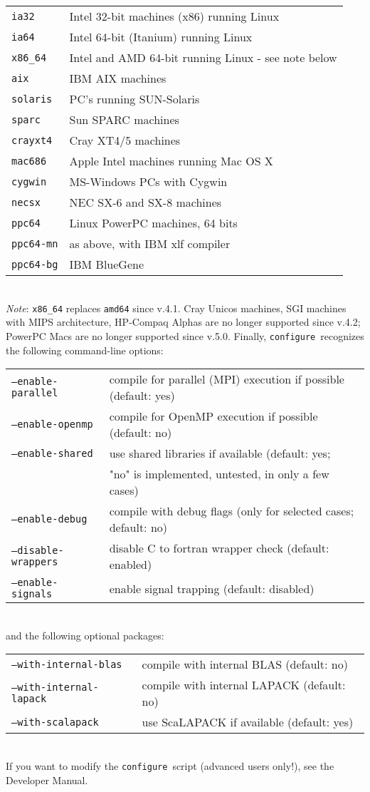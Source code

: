 \documentclass[12pt,a4paper]{article}
\def\configure{\texttt{configure}}
\begin{document}
\begin{tabular}{ll}
\texttt{ia32}&    Intel 32-bit machines (x86) running Linux\\
\texttt{ia64}&    Intel 64-bit (Itanium) running Linux\\
\texttt{x86\_64}&  Intel and AMD 64-bit running Linux - see note below\\
\texttt{aix}&     IBM AIX machines\\
\texttt{solaris}& PC's running SUN-Solaris\\
\texttt{sparc}&   Sun SPARC machines\\
\texttt{crayxt4}& Cray XT4/5 machines\\
\texttt{mac686}&  Apple Intel machines running Mac OS X\\
\texttt{cygwin}&  MS-Windows PCs with Cygwin\\
\texttt{necsx}&   NEC SX-6 and SX-8 machines\\
\texttt{ppc64}&   Linux PowerPC machines, 64 bits\\
\texttt{ppc64-mn}&as above, with IBM xlf compiler\\
\texttt{ppc64-bg}&IBM BlueGene
\end{tabular}\\
{\em Note}: \texttt{x86\_64} replaces \texttt{amd64} since v.4.1. 
Cray Unicos machines, SGI 
machines with MIPS architecture, HP-Compaq Alphas are no longer supported
since v.4.2; PowerPC Macs are no longer
supported since v.5.0.
Finally, \configure\ recognizes the following command-line options:\\
\begin{tabular}{ll}
\texttt{--enable-parallel}&     compile for parallel (MPI) execution if possible (default: yes)\\
\texttt{--enable-openmp}&       compile for OpenMP execution if possible (default: no)\\
\texttt{--enable-shared}&       use shared libraries if available (default: yes;\\
                        &       "no" is implemented, untested, in only a few cases)\\
\texttt{--enable-debug}&        compile with debug flags (only for selected cases; default: no)\\
\texttt{--disable-wrappers}&    disable C to fortran wrapper check (default: enabled)\\
\texttt{--enable-signals}&      enable signal trapping (default: disabled)\\
\end{tabular}\\
and the following optional packages:\\
\begin{tabular}{ll}
\texttt{--with-internal-blas}&    compile with internal BLAS (default: no)\\
\texttt{--with-internal-lapack}&  compile with internal LAPACK (default: no)\\
\texttt{--with-scalapack}&        use ScaLAPACK if available (default: yes)\\
\end{tabular}\\
If you want to modify the \configure\ script (advanced users only!), 
see the Developer Manual.
\end{document}
